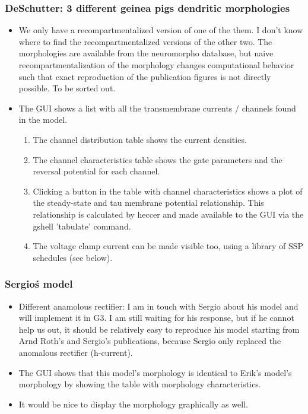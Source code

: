 \documentclass[12pt]{article}
\begin{document}
\subsubsection{DeSchutter: 3 different geinea pigs dendritic morphologies}
\begin{itemize}
\item We only have a recompartmentalized version of one of the them.
  I don't know where to find the recompartmentalized versions of the
  other two.  The morphologies are available from the neuromorpho
  database, but naive recompartmentalization of the morphology changes
  computational behavior such that exact reproduction of the
  publication figures is not directly possible.  To be sorted out.
\item The GUI shows a list with all the transmembrane currents /
  channels found in the model.
  \begin{enumerate}
  \item The channel distribution table shows the current densities.
  \item The channel characteristics table shows the gate parameters
    and the reversal potential for each channel.
  \item Clicking a button in the table with channel characteristics
    shows a plot of the steady-state and tau membrane potential
    relationship.  This relationship is calculated by heccer and made
    available to the GUI via the gshell 'tabulate' command.
  \item The voltage clamp current can be made visible too, using a
    library of SSP schedules (see below).
  \end{enumerate}
\end{itemize}


\subsubsection{Sergio\'s model}
\begin{itemize}
\item Different anamolous rectifier: I am in touch with Sergio about
  his model and will implement it in G3.  I am still waiting for his
  response, but if he cannot help us out, it should be relatively easy
  to reproduce his model starting from Arnd Roth's and Sergio's
  publications, because Sergio only replaced the anomalous rectifier
  (h-current).
\item The GUI shows that this model's morphology is identical to
  Erik's model's morphology by showing the table with morphology
  characteristics.
\item It would be nice to display the morphology graphically as well.
\end{itemize}
\end{document}
